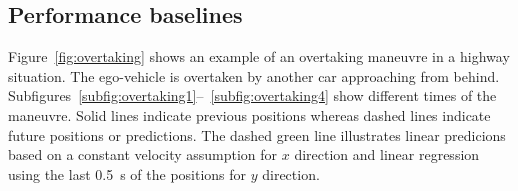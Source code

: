 \subsection{Performance baselines}
\label{subsec:baselines}
Figure~\ref{fig:overtaking} shows an example of an overtaking maneuvre in a highway situation.
The ego-vehicle is overtaken by another car approaching from behind.
Subfigures~\ref{subfig:overtaking1}--~\ref{subfig:overtaking4} show different times of the maneuvre.
Solid lines indicate previous positions whereas dashed lines indicate future positions or predictions.
The dashed green line illustrates linear predicions based on a constant velocity assumption for $x$ direction and linear regression using the last \SI{0.5}{\second} of the positions for $y$ direction.
\begin{figure}[H]
	\centering
	\vspace{-0.3cm}
	\vspace{-0.3cm}
\end{figure}
